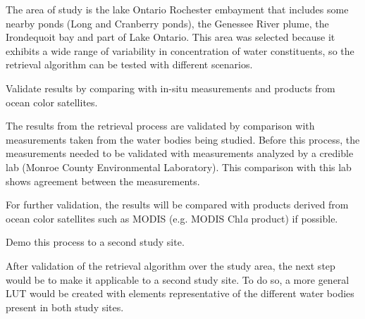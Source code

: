 \begin{enumerate}
The area of study is the lake Ontario Rochester embayment that includes some nearby ponds (Long and Cranberry ponds), the Genessee River plume, the Irondequoit bay and part of Lake Ontario. This area was selected because it exhibits a wide range of variability in concentration of water constituents, so the retrieval algorithm can be tested with different scenarios.
 
	{\bf \item Validate results by comparing with in-situ measurements and products from ocean color satellites.}

The results from the retrieval process are validated by comparison with measurements taken from the water bodies being studied. Before this process, the measurements needed to be validated with measurements analyzed by a credible lab (Monroe County Environmental Laboratory). This comparison with this lab shows agreement between the measurements. 

For further validation, the results will be compared with products derived from ocean color satellites such as MODIS (e.g. MODIS Chl{\it a} product) if possible.

	{\bf \item { Demo this process to a second study site}.}

After validation of the retrieval algorithm over the study area, the next step would be to make it applicable to a second study site. To do so, a more general LUT would be created with elements representative of the different water bodies present in both study sites.


\end{enumerate}


